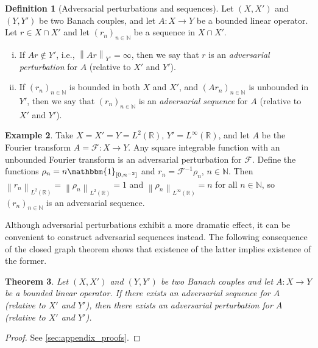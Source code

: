 \documentclass{article}
\newtheorem{theorem}{Theorem}[section]
\theoremstyle{definition}
\newtheorem{definition}[theorem]{Definition}
\newtheorem{example}[theorem]{Example}
\newcommand{\N}{\mathbb{N}}
\newcommand{\R}{\mathbb{R}}
\newcommand{\norm}[1]{\left\lVert#1\right\rVert}
\newcommand{\characteristic}[1]{\mathbbm{1}_{#1}}
\newcommand{\fourier}{\mathcal{F}}
\begin{document}
\begin{definition}[Adversarial perturbations and sequences]
\label{def:weq:aps}
    Let \((X,X')\) and \((Y,Y')\) be two Banach couples, and let \(A\colon X\to Y\) be a bounded linear operator.
    Let \(r\in X\cap X'\) and let \((r_n)_{n\in\N}\) be a sequence in \(X\cap X'\).
    \begin{enumerate}[(i)]
        \item If \(Ar\notin Y'\), i.e., \(\norm{Ar}_{Y'}=\infty\), then we say that \(r\) is an \emph{adversarial perturbation} for \(A\) (relative to \(X'\) and \(Y'\)).
        \item If \((r_n)_{n\in\N}\) is bounded in both \(X\) and \(X'\), and \((Ar_n)_{n\in\N}\) is unbounded in \(Y'\),
        then we say that \((r_n)_{n\in\N}\) is an \emph{adversarial sequence} for \(A\) (relative to \(X'\) and \(Y'\)).
    \end{enumerate}
\end{definition}



\begin{example}
     Take \(X=X'=Y=L^2(\R)\), \(Y'=L^\infty(\R)\), and let \(A\) be 
    the Fourier transform \(A=\fourier\colon X\to Y\).
    Any square integrable function with an unbounded Fourier transform is an adversarial perturbation for \(\fourier\).
    Define the functions
    \(\rho_n=n\characteristic{[0,n^{-2}]}\)
    and \(r_n=\fourier^{-1}\rho_n\), \(n\in\N\).
    Then \(\norm{r_n}_{L^2(\R)}=\norm{\rho_n}_{L^2(\R)}=1\) and \(\norm{\rho_n}_{L^\infty(\R)}=n\) for all \(n\in\N\), so \((r_n)_{n\in\N}\) is an adversarial sequence.
\end{example}



Although adversarial perturbations exhibit a more dramatic effect, it can be convenient to construct adversarial sequences instead.
The following consequence of the closed graph theorem shows that existence of the latter implies existence of the former.

\begin{theorem}
\label{thm:advseqadvpert}
    Let \((X,X')\) and \((Y,Y')\) be two Banach couples
    and let \(A\colon X\to Y\) be a bounded linear operator.
    If there exists an adversarial sequence for \(A\) (relative to \(X'\) and \(Y'\)),
    then there exists an adversarial perturbation for 
    \(A\) (relative to \(X'\) and \(Y'\)).
\end{theorem}
\begin{proof}
See \ref{sec:appendix_proofs}.
\end{proof}
\end{document}
